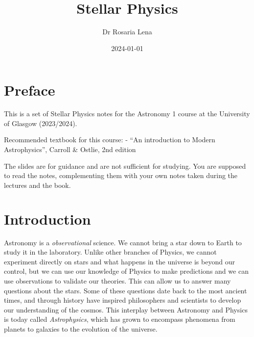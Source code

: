 \documentclass[
  letterpaper,
  DIV=11,
  numbers=noendperiod]{scrreprt}
\title{Stellar Physics}
\author{Dr Rosaria Lena}
\date{2024-01-01}
\renewcommand*\contentsname{Table of contents}
\newcommand\contentsname{Table of contents}
\begin{document}
\maketitle
\ifdefined\Shaded\renewenvironment{Shaded}{\begin{tcolorbox}[borderline west={3pt}{0pt}{shadecolor}, frame hidden, interior hidden, breakable, boxrule=0pt, sharp corners, enhanced]}{\end{tcolorbox}}\fi

\renewcommand*\contentsname{Table of contents}
{
\hypersetup{linkcolor=}
\setcounter{tocdepth}{2}
\tableofcontents
}

\hypertarget{preface}{%
\chapter*{Preface}\label{preface}}


This is a set of Stellar Physics notes for the Astronomy 1 course at the
University of Glasgow (2023/2024).

Recommended textbook for this course: - ``An introduction to Modern
Astrophysics'', Carroll \& Ostlie, 2nd edition

The slides are for guidance and are not sufficient for studying. You are
supposed to read the notes, complementing them with your own notes taken
during the lectures and the book.


\hypertarget{introduction}{%
\chapter*{Introduction}\label{introduction}}


Astronomy is a \emph{observational} science. We cannot bring a star down
to Earth to study it in the laboratory. Unlike other branches of
Physics, we cannot experiment directly on stars and what happens in the
universe is beyond our control, but we can use our knowledge of Physics
to make predictions and we can use observations to validate our
theories. This can allow us to answer many questions about the stars.
Some of these questions date back to the most ancient times, and through
history have inspired philosophers and scientists to develop our
understanding of the cosmos. This interplay between Astronomy and
Physics is today called \emph{Astrophysics}, which has grown to
encompass phenomena from planets to galaxies to the evolution of the
universe.
\end{document}

